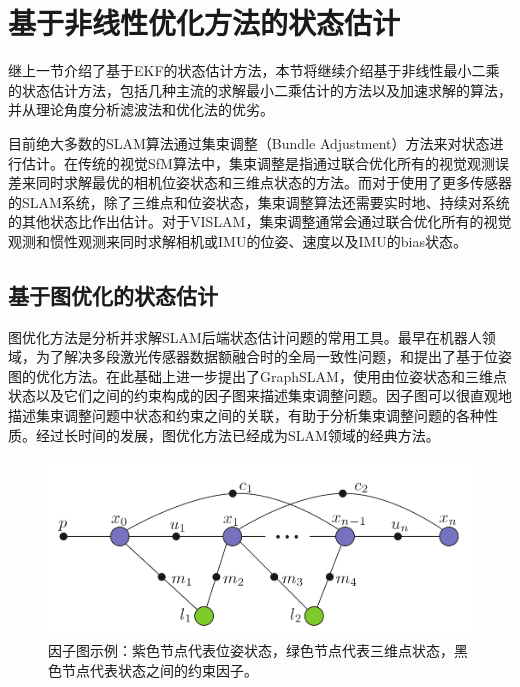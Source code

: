\section{基于非线性优化方法的状态估计}

继上一节介绍了基于EKF的状态估计方法，本节将继续介绍基于非线性最小二乘的状态估计方法，包括几种主流的求解最小二乘估计的方法以及加速求解的算法，并从理论角度分析滤波法和优化法的优劣。

目前绝大多数的SLAM算法通过集束调整\citep{triggs1999bundle}（Bundle Adjustment）方法来对状态进行估计。在传统的视觉SfM算法中，集束调整是指通过联合优化所有的视觉观测误差来同时求解最优的相机位姿状态和三维点状态的方法。而对于使用了更多传感器的SLAM系统，除了三维点和位姿状态，集束调整算法还需要实时地、持续对系统的其他状态比作出估计。对于VISLAM，集束调整通常会通过联合优化所有的视觉观测和惯性观测来同时求解相机或IMU的位姿、速度以及IMU的bias状态。

\subsection{基于图优化的状态估计}

图优化方法是分析并求解SLAM后端状态估计问题的常用工具。最早在机器人领域，为了解决多段激光传感器数据额融合时的全局一致性问题，和提出了基于位姿图的优化方法。在此基础上进一步提出了GraphSLAM，使用由位姿状态和三维点状态以及它们之间的约束构成的因子图来描述集束调整问题。因子图可以很直观地描述集束调整问题中状态和约束之间的关联，有助于分析集束调整问题的各种性质。经过长时间的发展，图优化方法已经成为SLAM领域的经典方法。

\begin{figure}[htb!]
    \centering
    \includegraphics[width=.6\textwidth]{Pictures/isam_factor_graph.png}
    \caption{因子图示例\citep{kaess2012isam2}：紫色节点代表位姿状态，绿色节点代表三维点状态，黑色节点代表状态之间的约束因子。}
    \label{fig:isam_factor_graph}
\end{figure}

